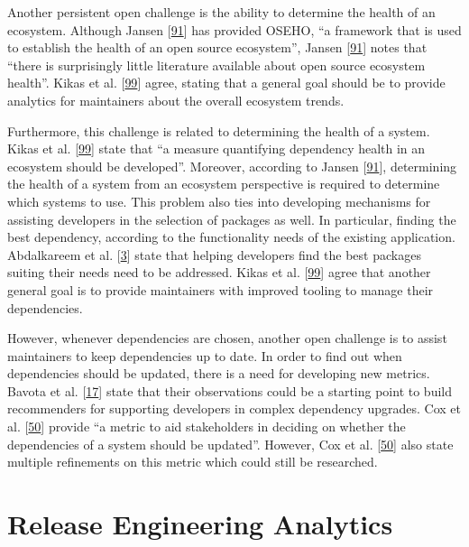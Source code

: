 \documentclass[]{book}
\begin{document}
Another persistent open challenge is the ability to determine the health
of an ecosystem. Although Jansen
{[}\protect\hyperlink{ref-Jansen2014}{91}{]} has provided OSEHO, ``a
framework that is used to establish the health of an open source
ecosystem'', Jansen {[}\protect\hyperlink{ref-Jansen2014}{91}{]} notes
that ``there is surprisingly little literature available about open
source ecosystem health''. Kikas et al.
{[}\protect\hyperlink{ref-Kikas2017}{99}{]} agree, stating that a
general goal should be to provide analytics for maintainers about the
overall ecosystem trends.

Furthermore, this challenge is related to determining the health of a
system. Kikas et al. {[}\protect\hyperlink{ref-Kikas2017}{99}{]} state
that ``a measure quantifying dependency health in an ecosystem should be
developed''. Moreover, according to Jansen
{[}\protect\hyperlink{ref-Jansen2014}{91}{]}, determining the health of
a system from an ecosystem perspective is required to determine which
systems to use. This problem also ties into developing mechanisms for
assisting developers in the selection of packages as well. In
particular, finding the best dependency, according to the functionality
needs of the existing application. Abdalkareem et al.
{[}\protect\hyperlink{ref-Abdalkareem2017}{3}{]} state that helping
developers find the best packages suiting their needs need to be
addressed. Kikas et al. {[}\protect\hyperlink{ref-Kikas2017}{99}{]}
agree that another general goal is to provide maintainers with improved
tooling to manage their dependencies.

However, whenever dependencies are chosen, another open challenge is to
assist maintainers to keep dependencies up to date. In order to find out
when dependencies should be updated, there is a need for developing new
metrics. Bavota et al. {[}\protect\hyperlink{ref-Bavota2014}{17}{]}
state that their observations could be a starting point to build
recommenders for supporting developers in complex dependency upgrades.
Cox et al. {[}\protect\hyperlink{ref-Cox2015}{50}{]} provide ``a metric
to aid stakeholders in deciding on whether the dependencies of a system
should be updated''. However, Cox et al.
{[}\protect\hyperlink{ref-Cox2015}{50}{]} also state multiple
refinements on this metric which could still be researched.

\chapter{Release Engineering
Analytics}\label{release-engineering-analytics}
\end{document}
